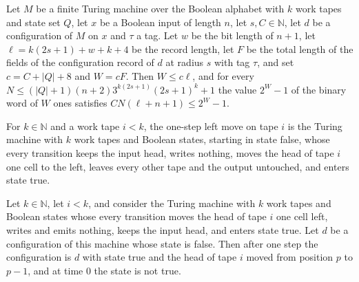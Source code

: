\begin{lemma}
\label{Turing.cw_record_clock}
\leanok
{}
Let $M$ be a finite Turing machine over the Boolean alphabet with $k$ work tapes and state set
$Q$, let $x$ be a Boolean input of length $n$, let $s,C\in\mathbb{N}$, let $d$ be a
configuration of $M$ on $x$ and $\tau$ a tag. Let $w$ be the bit length of $n+1$, let
$\ell=k(2s+1)+w+k+4$ be the record length, let $F$ be the total length of the fields of the
configuration record of $d$ at radius $s$ with tag $\tau$, and set $c=C+|Q|+8$ and $W=cF$. Then
$W\le c\ell$, and for every $N\le (|Q|+1)(n+2)3^{k(2s+1)}(2s+1)^k+1$ the value $2^W-1$ of the
binary word of $W$ ones satisfies $CN(\ell+n+1)\le 2^W-1$.
\end{lemma}

\begin{definition}
\label{Turing.cw_leftTM}
\leanok
{}
For $k\in\mathbb{N}$ and a work tape $i<k$, the one-step left move on tape $i$ is the Turing
machine with $k$ work tapes and Boolean states, starting in state false, whose every transition
keeps the input head, writes nothing, moves the head of tape $i$ one cell to the left, leaves
every other tape and the output untouched, and enters state true.
\end{definition}

\begin{lemma}
\label{Turing.cw_left_run}
\leanok
{}
Let $k\in\mathbb{N}$, let $i<k$, and consider the Turing machine with $k$ work tapes and
Boolean states whose every transition moves the head of tape $i$ one cell left, writes and
emits nothing, keeps the input head, and enters state true. Let $d$ be a configuration of this
machine whose state is false. Then after one step the configuration is $d$ with state true and
the head of tape $i$ moved from position $p$ to $p-1$, and at time $0$ the state is not true.
\end{lemma}

